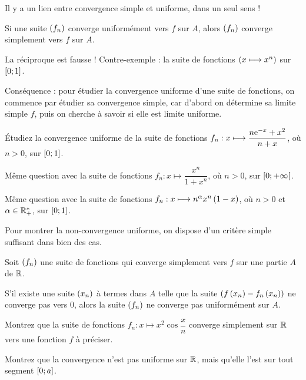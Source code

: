 Il y a un lien entre convergence simple et uniforme, dans un seul sens !

\begin{theo}
Si une suite \(\left(f_n\right)\) converge uniformément vers \(f\) sur \(A\), alors \(\left(f_n\right)\) converge simplement vers \(f\) sur \(A\).
\end{theo}

La réciproque est fausse ! Contre-exemple : la suite de fonctions \(\left(x\longmapsto x^n\right)\) sur \(\left[0;1\right]\).

Conséquence : pour étudier la convergence uniforme d'une suite de fonctions, on commence par étudier sa convergence simple, car d'abord on détermine sa limite simple \(f\), puis on cherche à savoir si elle est limite uniforme.

\begin{exo}
Étudiez la convergence uniforme de la suite de fonctions \(f_n:x\longmapsto\dfrac{n\mathrm{e}^{-x}+x^2}{n+x}\), où \(n>0\), sur \(\left[0;1\right]\).
\end{exo}

\begin{exo}
Même question avec la suite de fonctions \(f_n:x\mapsto\dfrac{x^n}{1+x^n}\), où \(n>0\), sur \(\left[0;+\infty\right[\).
\end{exo}

\begin{exo}
Même question avec la suite de fonctions \(f_n:x\longmapsto n^\alpha x^n\left(1-x\right)\), où \(n>0\) et \(\alpha\in\mathbb{R}_+^*\), sur \(\left[0;1\right]\).
\end{exo}

Pour montrer la non-convergence uniforme, on dispose d'un critère simple suffisant dans bien des cas.

\begin{prop}
Soit \(\left(f_n\right)\) une suite de fonctions qui converge simplement vers \(f\) sur une partie \(A\) de \(\mathbb{R}\).

S'il existe une suite \(\left(x_n\right)\) à termes dans \(A\) telle que la suite \(\left(f\left(x_n\right)-f_n\left(x_n\right)\right)\) ne converge pas vers \(0\), alors la suite \(\left(f_n\right)\) ne converge pas uniformément sur \(A\).
\end{prop}

\begin{exo}
Montrez que la suite de fonctions \(f_n:x\mapsto x^2\cos\dfrac{x}{n}\) converge simplement sur \(\mathbb{R}\) vers une fonction \(f\) à préciser.

Montrez que la convergence n'est pas uniforme sur \(\mathbb{R}\), mais qu'elle l'est sur tout segment \(\left[0;a\right]\).
\end{exo}

